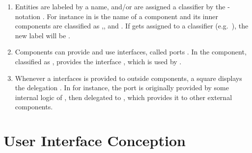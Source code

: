 \begin{enumerate}
    \item Entities are labeled by a name, and/or are assigned a  classifier by the \ssay{:[classifier]}-notation  \parencite[cf.][125]{ObjectManagementGroup.01.03.2015}. For instance in   is the name of a component and its inner components are classified as ,, and . If  gets assigned to a classifier (e.g.~), the new label will be .
    
    \item Components can provide and use interfaces, called ports \parencite[cf.][182-184]{ObjectManagementGroup.01.03.2015}. In  the component, classified as , provides the interface , which is used by .
    
    \item Whenever a interfaces is provided to outside components, a square displays the delegation \parencite[cf.][212]{ObjectManagementGroup.01.03.2015}. In  for instance, the port  is originally provided by some internal logic of , then delegated to , which provides it to other external components. 
\end{enumerate}

\section{User Interface Conception}


